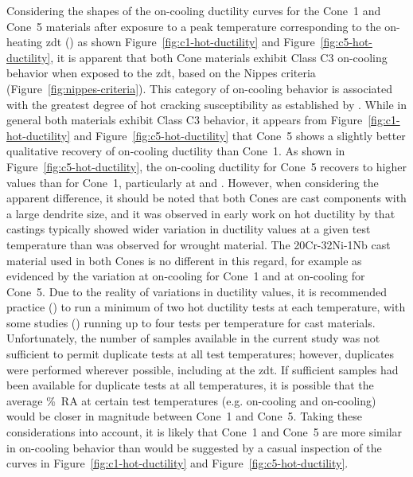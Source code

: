 {Considering the shapes of the on-cooling ductility curves for the Cone~1 and Cone~5 materials after exposure to a peak temperature corresponding to the on-heating \gls{zdt} () as shown Figure~\ref{fig:c1-hot-ductility} and Figure~\ref{fig:c5-hot-ductility}, it is apparent that both Cone materials exhibit Class C3 on-cooling behavior when exposed to the \gls{zdt}, based on the Nippes criteria (Figure~\ref{fig:nippes-criteria}).  This category of on-cooling behavior is associated with the greatest degree of hot cracking susceptibility as established by \citet{nippes_further_1957}.  While in general both materials exhibit Class C3 behavior, it appears from Figure~\ref{fig:c1-hot-ductility} and Figure~\ref{fig:c5-hot-ductility} that Cone~5 shows a slightly better qualitative recovery of on-cooling ductility than Cone~1.  As shown in Figure~\ref{fig:c5-hot-ductility}, the on-cooling ductility for Cone~5 recovers to higher values than for Cone~1, particularly at  and .  However, when considering the apparent difference, it should be noted that both Cones are cast components with a large dendrite size, and it was observed in early work on hot ductility by \citet{nippes_further_1957} that castings typically showed wider variation in ductility values at a given test temperature than was observed for wrought material.  The 20Cr-32Ni-1Nb cast material used in both Cones is no different in this regard, for example as evidenced by the variation at  on-cooling for Cone~1 and at  on-cooling for Cone~5.  Due to the reality of variations in ductility values, it is recommended practice (\citet{lundin_standardization_1990_experiment}) to run a minimum of two hot ductility tests at each temperature, with some studies (\citet{nippes_further_1957}) running up to four tests per temperature for cast materials.  Unfortunately, the number of samples available in the current study was not sufficient to permit duplicate tests at all test temperatures; however, duplicates were performed wherever possible, including at the \gls{zdt}.  If sufficient samples had been available for duplicate tests at all temperatures, it is possible that the average \%~RA at certain test temperatures (e.g.  on-cooling and  on-cooling) would be closer in magnitude between Cone~1 and Cone~5.  Taking these considerations into account, it is likely that Cone~1 and Cone~5 are more similar in on-cooling behavior than would be suggested by a casual inspection of the curves in Figure~\ref{fig:c1-hot-ductility} and Figure~\ref{fig:c5-hot-ductility}.

}
